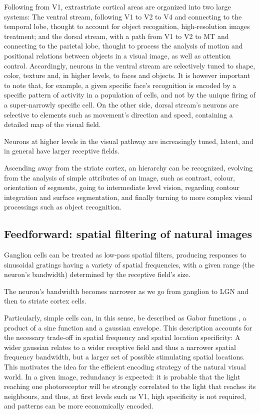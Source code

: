 Following from V1, extrastriate cortical areas are organized into two large systems: The ventral stream, following V1 to V2 to V4 and connecting to the temporal lobe, thought to account for object recognition, high-resolution images treatment; and the dorsal stream, with a path from V1 to V2 to MT and connecting to the parietal lobe, thought to process the analysis of motion and positional relations between objects in a visual image, as well as attention control. Accordingly, neurons in the ventral stream are selectively tuned to shape, color, texture and, in higher levels, to faces and objects. It is however important to note that, for example, a given specific face's recognition is encoded by a specific pattern of activity in a population of cells, and not by the unique firing of a super-narrowly specific cell. On the other side, dorsal stream's neurons are selective to elements such as movement's direction and speed, containing a detailed map of the visual field.

Neurons at higher levels in the visual pathway are increasingly tuned, latent, and in general have larger receptive fields.

Ascending away from the striate cortex, an hierarchy can be recognized, evolving from the analysis of simple attributes of an image, such as contrast, colour, orientation of segments, going to intermediate level vision, regarding contour integration and surface segmentation, and finally turning to more complex visual processings such as object recognition. 


\vspace{-0.2cm}
 
\subsection{Feedforward: spatial filtering of natural images}

Ganglion cells can be treated as low-pass spatial filters, producing responses to sinusoidal gratings having a variety of spatial frequencies, with a given range (the neuron's bandwidth) determined by the receptive field's size. 

The neuron's bandwidth becomes narrower as we go from ganglion to LGN and then to striate cortex cells. 

Particularly, simple cells can, in this sense, be described as Gabor functions \cite{noGabor}, a product of a sine function and a gaussian envelope. This description accounts for the necessary trade-off in spatial frequency and spatial location specificity: A wider gaussian relates to a wider receptive field and thus a narrower spatial frequency bandwidth, but a larger set of possible stimulating spatial locations. This motivates the idea for the efficient encoding strategy of the natural visual world. In a given image, redundancy is expected: it is probable that the light reaching one photoreceptor will be strongly correlated to the light that reaches its neighbours, and thus, at first levels such as V1, high specificity is not required, and patterns can be more economically encoded.

